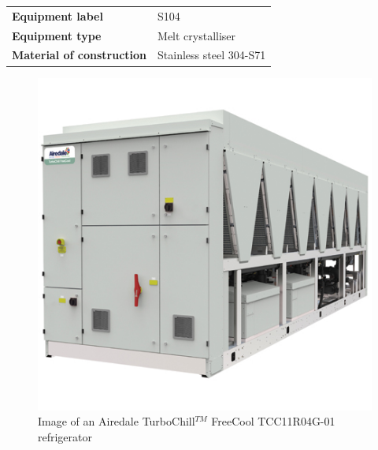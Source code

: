 \begin{table}[H]
    \centering
    \begin{tabular}{@{}l|l@{}}
    \toprule
      \textbf{Equipment label}  & S104\\
       \textbf{Equipment type}  & Melt crystalliser \\
       \textbf{Material of construction} & Stainless steel 304-S71 \\
       \bottomrule
    \end{tabular}
\end{table}


\begin{figure}[H]
    \centering
    \includegraphics[scale=0.5]{chapters/3-separation/figures/Refrigerator.jpg}
    \caption{Image of an Airedale TurboChill$^{TM}$ FreeCool TCC11R04G-01 refrigerator}
    \label{fig:schematic refrigerator process design data sheet}
\end{figure}

